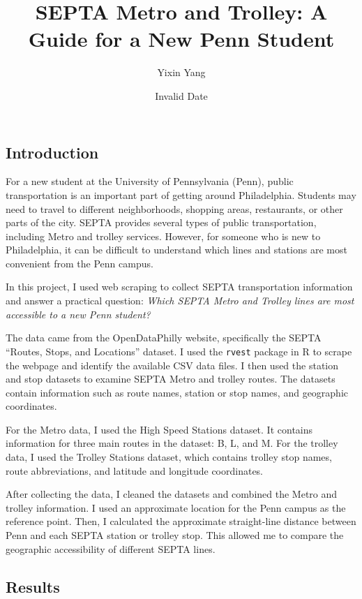 \documentclass[
]{article}
\title{SEPTA Metro and Trolley: A Guide for a New Penn Student}
\author{Yixin Yang}
\date{Invalid Date}
\begin{document}
\maketitle


\subsection{Introduction}\label{introduction}

For a new student at the University of Pennsylvania (Penn), public
transportation is an important part of getting around Philadelphia.
Students may need to travel to different neighborhoods, shopping areas,
restaurants, or other parts of the city. SEPTA provides several types of
public transportation, including Metro and trolley services. However,
for someone who is new to Philadelphia, it can be difficult to
understand which lines and stations are most convenient from the Penn
campus.

In this project, I used web scraping to collect SEPTA transportation
information and answer a practical question: \emph{Which SEPTA Metro and
Trolley lines are most accessible to a new Penn student?}

The data came from the OpenDataPhilly website, specifically the SEPTA
``Routes, Stops, and Locations'' dataset. I used the \texttt{rvest}
package in R to scrape the webpage and identify the available CSV data
files. I then used the station and stop datasets to examine SEPTA Metro
and trolley routes. The datasets contain information such as route
names, station or stop names, and geographic coordinates.

For the Metro data, I used the High Speed Stations dataset. It contains
information for three main routes in the dataset: B, L, and M. For the
trolley data, I used the Trolley Stations dataset, which contains
trolley stop names, route abbreviations, and latitude and longitude
coordinates.

After collecting the data, I cleaned the datasets and combined the Metro
and trolley information. I used an approximate location for the Penn
campus as the reference point. Then, I calculated the approximate
straight-line distance between Penn and each SEPTA station or trolley
stop. This allowed me to compare the geographic accessibility of
different SEPTA lines.

\subsection{Results}\label{results}
\end{document}
